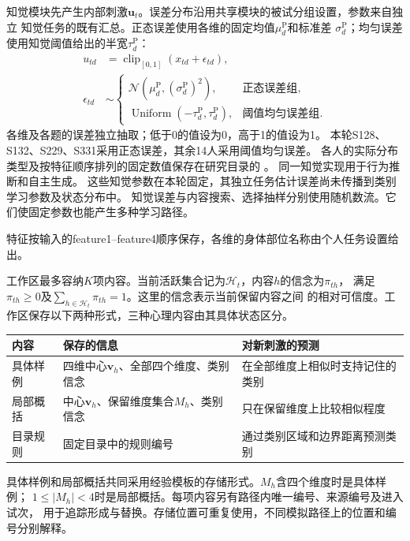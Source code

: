 \documentclass[11pt,a4paper]{article}
\numberwithin{equation}{section}
\newcommand{\clip}{\operatorname{clip}}
\begin{document}
知觉模块先产生内部刺激$\bm u_t$。误差分布沿用共享模块的被试分组设置，参数来自独立
知觉任务的既有汇总。正态误差使用各维的固定均值$\mu_d^{\mathrm P}$和标准差
$\sigma_d^{\mathrm P}$；均匀误差使用知觉阈值给出的半宽$\tau_d^{\mathrm P}$：
\begin{equation}
\begin{aligned}
u_{td}&=\clip_{[0,1]}(x_{td}+\epsilon_{td}),\\
\epsilon_{td}&\sim\begin{cases}
\mathcal N\!\left(\mu_d^{\mathrm P},(\sigma_d^{\mathrm P})^2\right),&\text{正态误差组},\\
\operatorname{Uniform}(-\tau_d^{\mathrm P},\tau_d^{\mathrm P}),&\text{阈值均匀误差组}.
\end{cases}
\end{aligned}
\label{eq:perception}
\end{equation}
各维及各题的误差独立抽取；低于0的值设为0，高于1的值设为1。
本轮S128、S132、S229、S331采用正态误差，其余14人采用阈值均匀误差。
各人的实际分布类型及按特征顺序排列的固定数值保存在研究目录的
。
同一知觉实现用于行为推断和自主生成。
这些知觉参数在本轮固定，其独立任务估计误差尚未传播到类别学习参数及状态分布中。
知觉误差与内容搜索、选择抽样分别使用随机数流。它们使固定参数也能产生多种学习路径。

特征按输入的feature1--feature4顺序保存，各维的身体部位名称由个人任务设置给出。

工作区最多容纳$K$项内容。当前活跃集合记为$\mathcal H_t$，内容$h$的信念为$\pi_{th}$，
满足$\pi_{th}\geq0$及$\sum_{h\in\mathcal H_t}\pi_{th}=1$。这里的信念表示当前保留内容之间
的相对可信度。工作区保存以下两种形式，三种心理内容由其具体状态区分。

\begin{center}
\begin{tabularx}{\textwidth}{p{2.0cm}Y Y}
\toprule
内容 & 保存的信息 & 对新刺激的预测\\
\midrule
具体样例 & 四维中心$\bm v_h$、全部四个维度、类别信念 & 在全部维度上相似时支持记住的类别\\
局部概括 & 中心$\bm v_h$、保留维度集合$M_h$、类别信念 & 只在保留维度上比较相似程度\\
目录规则 & 固定目录中的规则编号 & 通过类别区域和边界距离预测类别\\
\bottomrule
\end{tabularx}
\end{center}

具体样例和局部概括共同采用经验模板的存储形式。$M_h$含四个维度时是具体样例；
$1\leq |M_h|<4$时是局部概括。每项内容另有路径内唯一编号、来源编号及进入试次，
用于追踪形成与替换。存储位置可重复使用，不同模拟路径上的位置和编号分别解释。
\end{document}
